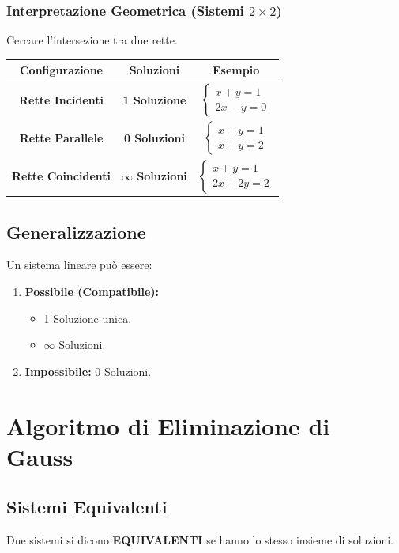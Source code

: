 \subsubsection{Interpretazione Geometrica (Sistemi $2 \times 2$)}
Cercare l'intersezione tra due rette.
\begin{center}
\begin{tabular}{ccc}
\toprule
\textbf{Configurazione} & \textbf{Soluzioni} & \textbf{Esempio} \\
\midrule
\textbf{Rette Incidenti} & \textbf{1 Soluzione} & $\begin{cases} x+y=1 \\ 2x-y=0 \end{cases}$ \\
\midrule
\textbf{Rette Parallele} & \textbf{0 Soluzioni} & $\begin{cases} x+y=1 \\ x+y=2 \end{cases}$ \\
\midrule
\textbf{Rette Coincidenti} & \textbf{$\infty$ Soluzioni} & $\begin{cases} x+y=1 \\ 2x+2y=2 \end{cases}$ \\
\bottomrule
\end{tabular}
\end{center}

\subsection{Generalizzazione}
Un sistema lineare può essere:
\begin{enumerate}
    \item \textbf{Possibile (Compatibile):}
    \begin{itemize}
        \item 1 Soluzione unica.
        \item $\infty$ Soluzioni.
    \end{itemize}
    \item \textbf{Impossibile:} 0 Soluzioni.
\end{enumerate}

\section{Algoritmo di Eliminazione di Gauss}

\subsection{Sistemi Equivalenti}
Due sistemi si dicono \textbf{EQUIVALENTI} se hanno lo stesso insieme di soluzioni.

